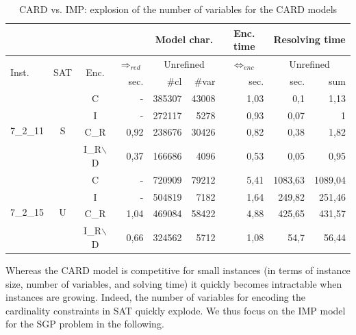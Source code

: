 \documentclass[3p,authoryear,times]{elsarticle}
\newcommand{\rmin}[0]{{\Rightarrow_{red}}}
\newcommand{\enc}[0]{\Leftrightarrow_{enc}}
\begin{document}
\begin{table}[hbt!]
\caption{CARD vs. IMP: explosion of the number of variables for the CARD models}
\label{tab:cardimp}
\begin{center}
\begin{footnotesize}
\begin{tabular}{|l |c| c | r | r | r || r|| r| r|}
\cline{5-9}
\multicolumn{4}{c|}{}&\multicolumn{2}{c||}{Model char.}&\multicolumn{1}{c||}{Enc. time}&\multicolumn{2}{c|}{Resolving time}\\
\hline
\multirow{2}{*}{Inst.}&\multirow{2}{*}{SAT}&\multirow{2}{*}{Enc.}&$\rmin$	&\multicolumn{2}{c||}{Unrefined}		&\multicolumn{1}{c||}{$\enc$}	 	&\multicolumn{2}{c|}{Unrefined}	\\
&&&sec.	&\#cl		&\#var		&sec.		&sec.	&sum	\\
\hline\hline
\multirow{4}{*}{7\_2\_11}&\multirow{4}{*}{S}&C&-&385307&43008&1,03&0,1&1,13\\ \cline{3-9}
&&I&-&272117&5278&0,93&0,07&1\\ \cline{3-9}
&&C\_R&0,92&238676&30426&0,82&0,38&1,82\\ \cline{3-9}
&&I\_R$\backslash$D&0,37&166686&4096&0,53&0,05&0,95\\ \hline \hline
\multirow{4}{*}{7\_2\_15}&\multirow{4}{*}{U}&C&-&720909&79212&5,41&1083,63&1089,04\\ \cline{3-9}
&&I&-&504819&7182&1,64&249,82&251,46\\ \cline{3-9}
&&C\_R&1,04&469084&58422&4,88&425,65&431,57\\ \cline{3-9}
&&I\_R$\backslash$D&0,66&324562&5712&1,08&54,7&56,44\\ \hline
\end{tabular}

\end{footnotesize}
\end{center}
\end{table}


Whereas the CARD model is competitive for small instances (in terms of instance size, number of variables, and solving time) it quickly becomes intractable when instances are growing. Indeed, the number of variables for encoding the cardinality constraints in SAT quickly explode. We thus focus on the IMP model for the SGP problem in the following. 
\end{document}
